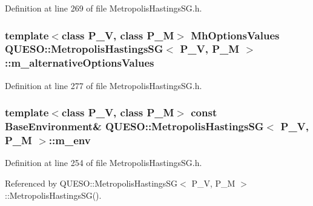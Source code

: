 Definition at line 269 of file Metropolis\-Hastings\-S\-G.\-h.

\hypertarget{class_q_u_e_s_o_1_1_metropolis_hastings_s_g_add6eb8fa2e706ef1de9772f71c84d839}{
\subsubsection[{m\-\_\-alternative\-Options\-Values}]{\setlength{\rightskip}{0pt plus 5cm}template$<$class P\-\_\-\-V, class P\-\_\-\-M$>$ {\bf Mh\-Options\-Values} {\bf Q\-U\-E\-S\-O\-::\-Metropolis\-Hastings\-S\-G}$<$ P\-\_\-\-V, P\-\_\-\-M $>$\-::m\-\_\-alternative\-Options\-Values\hspace{0.3cm}{\ttfamily [private]}}}\label{class_q_u_e_s_o_1_1_metropolis_hastings_s_g_add6eb8fa2e706ef1de9772f71c84d839}


Definition at line 277 of file Metropolis\-Hastings\-S\-G.\-h.

\hypertarget{class_q_u_e_s_o_1_1_metropolis_hastings_s_g_ac8ea061e55b920e0c8f9bce5c3f20e52}{
\subsubsection[{m\-\_\-env}]{\setlength{\rightskip}{0pt plus 5cm}template$<$class P\-\_\-\-V, class P\-\_\-\-M$>$ const {\bf Base\-Environment}\& {\bf Q\-U\-E\-S\-O\-::\-Metropolis\-Hastings\-S\-G}$<$ P\-\_\-\-V, P\-\_\-\-M $>$\-::m\-\_\-env\hspace{0.3cm}{\ttfamily [private]}}}\label{class_q_u_e_s_o_1_1_metropolis_hastings_s_g_ac8ea061e55b920e0c8f9bce5c3f20e52}


Definition at line 254 of file Metropolis\-Hastings\-S\-G.\-h.



Referenced by Q\-U\-E\-S\-O\-::\-Metropolis\-Hastings\-S\-G$<$ P\-\_\-\-V, P\-\_\-\-M $>$\-::\-Metropolis\-Hastings\-S\-G().

